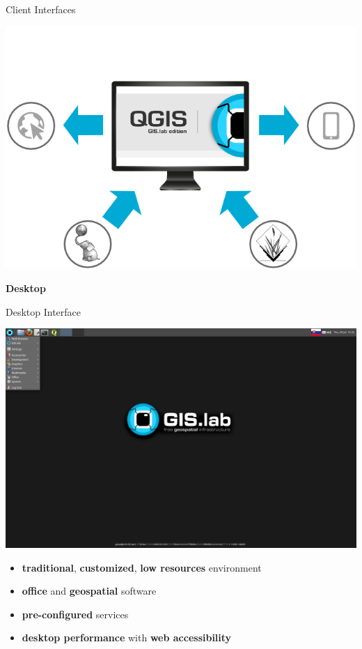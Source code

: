 \documentclass[12pt]{beamer}
\begin{document}
\begin{frame}[plain]{Client Interfaces}
	\begin{center}
		\includegraphics[keepaspectratio=true,width=\textwidth]{images/gislab-client-interfaces.png}
	\end{center}
\end{frame}


\begin{frame}
	\begin{center}
		\LARGE\textbf{Desktop}	
	\end{center}
\end{frame}

\begin{frame}{Desktop Interface}
	\begin{center}
		\includegraphics[keepaspectratio=true,height=0.5\textheight]{images/gislab-desktop.png}
	\end{center}
	\begin{itemize}
		\item \textbf{traditional}, \textbf{customized}, \textbf{low resources} environment
		\item \textbf{office} and \textbf{geospatial} software
		\item \textbf{pre-configured} services
		\item \textbf{desktop performance} with \textbf{web accessibility}
	\end{itemize}
\end{frame}
\end{document}

